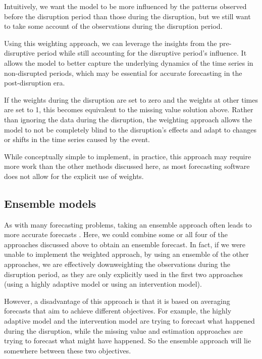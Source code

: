 \documentclass[
  11pt,
  a4paper,
]{article}
\begin{document}
Intuitively, we want the model to be more influenced by the patterns
observed before the disruption period than those during the disruption,
but we still want to take some account of the observations during the
disruption period.

Using this weighting approach, we can leverage the insights from the
pre-disruptive period while still accounting for the disruptive period's
influence. It allows the model to better capture the underlying dynamics
of the time series in non-disrupted periods, which may be essential for
accurate forecasting in the post-disruption era.

If the weights during the disruption are set to zero and the weights at
other times are set to 1, this becomes equivalent to the missing value
solution above. Rather than ignoring the data during the disruption, the
weighting approach allows the model to not be completely blind to the
disruption's effects and adapt to changes or shifts in the time series
caused by the event.

While conceptually simple to implement, in practice, this approach may
require more work than the other methods discussed here, as most
forecasting software does not allow for the explicit use of weights.

\subsection{Ensemble models}\label{ensemble-models}

As with many forecasting problems, taking an ensemble approach often
leads to more accurate forecasts \autocite{combinations}. Here, we could
combine some or all four of the approaches discussed above to obtain an
ensemble forecast. In fact, if we were unable to implement the weighted
approach, by using an ensemble of the other approaches, we are
effectively downweighting the observations during the disruption period,
as they are only explicitly used in the first two approaches (using a
highly adaptive model or using an intervention model).

However, a disadvantage of this approach is that it is based on
averaging forecasts that aim to achieve different objectives. For
example, the highly adaptive model and the intervention model are trying
to forecast what happened during the disruption, while the missing value
and estimation approaches are trying to forecast what might have
happened. So the ensemble approach will lie somewhere between these two
objectives.
\end{document}
